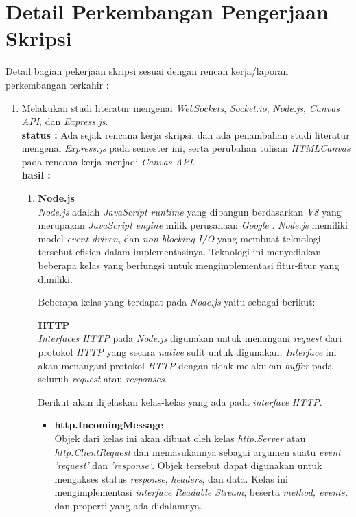 \documentclass[a4paper,twoside]{article}
\begin{document}
\section{Detail Perkembangan Pengerjaan Skripsi}
Detail bagian pekerjaan skripsi sesuai dengan rencan kerja/laporan perkembangan terkahir :
	\begin{enumerate}
		\item Melakukan studi literatur mengenai \textit{WebSockets}, \textit{Socket.io}, \textit{Node.js}, \textit{Canvas API}, dan \textit{Express.js}.\\
		{\bf status :} Ada sejak rencana kerja skripsi, dan ada penambahan studi literatur mengenai \textit{Express.js} pada semester ini, serta perubahan tulisan \textit{HTMLCanvas} pada rencana kerja menjadi \textit{Canvas API}.\\
		{\bf hasil :} \\
		\begin{enumerate}
			\item \textbf{Node.js} \\
			\textit{Node.js} adalah \textit{JavaScript runtime} yang dibangun berdasarkan \textit{V8} yang merupakan \textit{JavaScript engine} milik perusahaan \textit{Google} \cite{nodejs}. \textit{Node.js} memiliki model \textit{event-driven}, dan \textit{non-blocking I/O} yang membuat teknologi tersebut efisien dalam implementasinya. Teknologi ini menyediakan beberapa kelas yang berfungsi untuk mengimplementasi fitur-fitur yang dimiliki.
			
			Beberapa kelas yang terdapat pada \textit{Node.js} yaitu sebagai berikut:
			
			\textbf{HTTP} \\
			\textit{Interfaces} \textit{HTTP} pada \textit{Node.js} digunakan untuk menangani \textit{request} dari protokol \textit{HTTP} yang secara \textit{native} sulit untuk digunakan. \textit{Interface} ini akan menangani protokol \textit{HTTP} dengan tidak melakukan \textit{buffer} pada seluruh \textit{request} atau \textit{responses}.
			
			Berikut akan dijelaskan kelas-kelas yang ada pada \textit{interface} \textit{HTTP}.
			
			\begin{itemize}
				\item \textbf{http.IncomingMessage} \\ 
				Objek dari kelas ini akan dibuat oleh kelas \textit{http.Server} atau \textit{http.ClientRequest} dan memasukannya sebagai argumen suatu \textit{event} \textit{'request'} dan \textit{'response'}. Objek tersebut dapat digunakan untuk mengakses status \textit{response}, \textit{headers}, dan data. Kelas ini mengimplementasi \textit{interface Readable Stream}, beserta \textit{method, events,} dan properti yang ada didalamnya.
				

\end{itemize}
\end{enumerate}
\end{enumerate}
\end{document}
